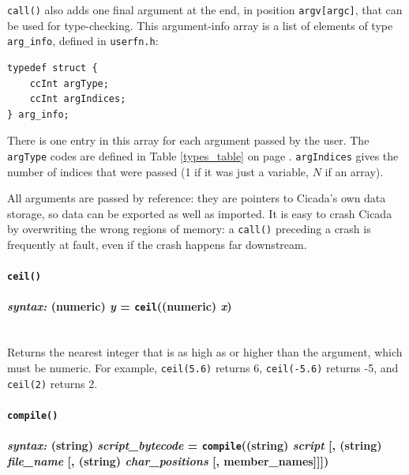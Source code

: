 \documentclass{article}
\newenvironment{code}{
       \begin{list}{}{
               \setlength{\leftmargin}{.4in}
               \setlength{\rightmargin}{0in}
               \setlength{\topsep}{.2in}
       }
       \small
       \item[] }
       { \end{list}   }
\begin{document}
\texttt{call()} also adds one final argument at the end, in position \verb#argv[argc]#, that can be used for type-checking.  This argument-info array is a list of elements of type \verb#arg_info#, defined in \verb#userfn.h#:

\begin{code} \begin{verbatim}
typedef struct {
    ccInt argType;
    ccInt argIndices;
} arg_info;
\end{verbatim} \end{code}

\noindent There is one entry in this array for each argument passed by the user.  The \verb#argType# codes are defined in Table \ref{types_table} on page \pageref{types_table}.  \verb#argIndices# gives the number of indices that were passed (1 if it was just a variable, $N$ if an array).

All arguments are passed by reference:  they are pointers to Cicada's own data storage, so data can be exported as well as imported.  It is easy to crash Cicada by overwriting the wrong regions of memory:  a \texttt{call()} preceding a crash is frequently at fault, even if the crash happens far downstream.\\






\paragraph{\texttt{ceil()}\\\\
\normalfont \emph{syntax: } (numeric) \emph{y} = \texttt{ceil}((numeric) \emph{x})\\\\}

Returns the nearest integer that is as high as or higher than the argument, which must be numeric.  For example, \verb$ceil(5.6)$ returns 6, \verb$ceil(-5.6)$ returns -5, and \verb$ceil(2)$ returns 2.\\



 


\paragraph{\texttt{compile()}\\\\
\normalfont \emph{syntax: } (string) \emph{script\_bytecode} = \texttt{compile}((string) \emph{script} [, (string) \emph{file\_name} [, (string) \emph{char\_positions} [, member\_names]]])\\\\}
\end{document}
